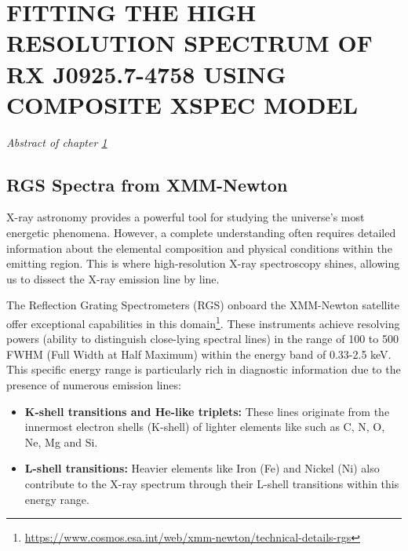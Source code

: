 \chapter{FITTING THE HIGH RESOLUTION SPECTRUM OF RX J0925.7-4758 USING COMPOSITE XSPEC MODEL} \label{chap:hi-resolution}
    \minitoc
    \begin{center}
    	\emph{Abstract of chapter \ref{chap:hi-resolution}}
    \end{center}

	\section{RGS Spectra from XMM-Newton} \label{hi-resolution:rgs-spec}
		X-ray astronomy provides a powerful tool for studying the universe's most energetic phenomena. However, a complete understanding often requires detailed information about the elemental composition and physical conditions within the emitting region. This is where high-resolution X-ray spectroscopy shines, allowing us to dissect the X-ray emission line by line.
		
		The Reflection Grating Spectrometers (RGS) onboard the XMM-Newton satellite offer exceptional capabilities in this domain\footnote{\url{https://www.cosmos.esa.int/web/xmm-newton/technical-details-rgs}}. These instruments achieve resolving powers (ability to distinguish close-lying spectral lines) in the range of 100 to 500 FWHM (Full Width at Half Maximum) within the energy band of 0.33-2.5 keV. This specific energy range is particularly rich in diagnostic information due to the presence of numerous emission lines:
		\begin{itemize}
			\item \textbf{K-shell transitions and He-like triplets:} These lines originate from the innermost electron shells (K-shell) of lighter elements like such as C, N, O, Ne, Mg and Si.
			
			\item \textbf{L-shell transitions:} Heavier elements like Iron (Fe) and Nickel (Ni) also contribute to the X-ray spectrum through their L-shell transitions within this energy range.
		\end{itemize}
		
